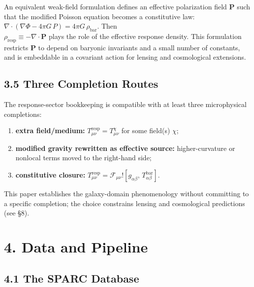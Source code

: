 An equivalent weak-field formulation defines an effective polarization field \textbf{P} such that the modified Poisson equation becomes a constitutive law: \(\nabla \cdot (\nabla\Phi - 4\pi G\, P) = 4\pi G\,\rho_{\text{bar}}\). Then\\
\(\rho_{\text{resp}} \equiv - \nabla \cdot \mathbf{P}\) plays the role of the effective response density. This formulation restricts \textbf{P} to depend on baryonic invariants and a small number of constants, and is embeddable in a covariant action for lensing and cosmological extensions.

\subsection{3.5 Three Completion Routes}\label{three-completion-routes}

The response-sector bookkeeping is compatible with at least three microphysical completions:

\begin{enumerate}
\def\labelenumi{(\roman{enumi})}
\item
  \textbf{extra field/medium:} \(T_{\mu\nu}^{\text{resp}} = T_{\mu\nu}^{\chi}\) for some field(s) \(\chi\);
\item
  \textbf{modified gravity rewritten as effective source:} higher-curvature or nonlocal terms moved to the right-hand side;
\item
  \textbf{constitutive closure:} \(T_{\mu\nu}^{\text{resp}} = \mathcal{F}_{\mu\nu}\text{!}\left\lbrack g_{\alpha\beta},\, T_{\alpha\beta}^{\text{bar}} \right\rbrack\).
\end{enumerate}

This paper establishes the galaxy-domain phenomenology without committing to a specific completion; the choice constrains lensing and cosmological predictions (see §8).

\section{}\label{section-5}

\section{4. Data and Pipeline}\label{data-and-pipeline}

\subsection{4.1 The SPARC Database}\label{the-sparc-database}


